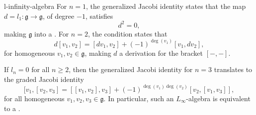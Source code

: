 \begin{example}{l-infinity-algebra}
    For $n = 1$, the generalized Jacobi identity states that the map $d = l_1 : \mathfrak{g} \to \mathfrak{g}$, of degree $-1$, satisfies
    \[ d^2 = 0 , \]
    making $\mathfrak{g}$ into a . For $n = 2$, the condition states that
    \[ d[v_1, v_2] = [dv_1, v_2] + (-1)^{\deg(v_1)} [v_1, dv_2] , \]
    for homogeneous $v_1, v_2 \in \mathfrak{g}$, making $d$ a derivation for the bracket $[-, -]$.
    
    If $l_n = 0$ for all $n \ge 2$, then the generalized Jacobi identity for $n = 3$ translates to the graded Jacobi identity
    \[ [v_1, [v_2, v_3] = [[v_1, v_2], v_3] + (-1)^{\deg(v_1) \deg(v_2)} [v_2, [v_1, v_3]] , \]
    for all homogeneous $v_1, v_2, v_3 \in \mathfrak{g}$. In particular, such an $L_\infty$-algebra is equivalent to a .
\end{example}
